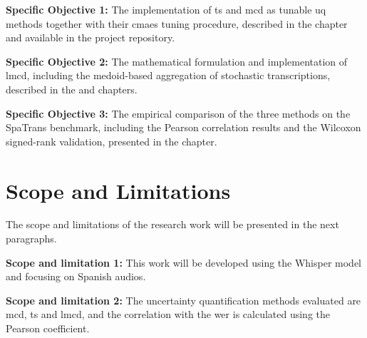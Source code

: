 \textbf{Specific Objective 1:}
The implementation of \acrshort{ts} and \acrshort{mcd} as tunable \acrshort{uq} methods together with their \acrshort{cmaes} tuning procedure, described in the  chapter and available in the project repository.

\textbf{Specific Objective 2:}
The mathematical formulation and implementation of \acrshort{lmcd}, including the medoid-based aggregation of stochastic transcriptions, described in the  and  chapters.

\textbf{Specific Objective 3:}
The empirical comparison of the three methods on the SpaTrans benchmark, including the Pearson correlation results and the Wilcoxon signed-rank validation, presented in the  chapter.


\section{Scope and Limitations}

The scope and limitations of the research work will be presented in the next paragraphs.

\textbf{Scope and limitation 1:}
This work will be developed using the Whisper model and focusing on Spanish audios.

\textbf{Scope and limitation 2:}
The uncertainty quantification methods evaluated are \acrshort{mcd}, \acrshort{ts} and \acrshort{lmcd}, and the correlation with the \acrshort{wer} is calculated using the Pearson coefficient.


